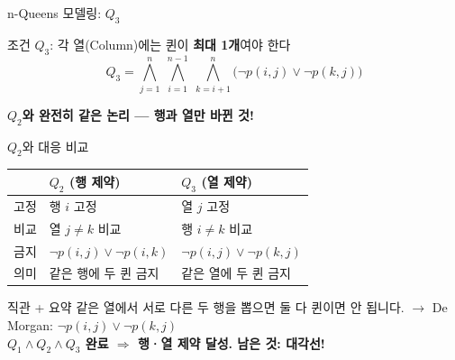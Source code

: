 \documentclass[10.5pt,compress]{beamer}
\begin{document}
\begin{frame}[t]{n-Queens 모델링: $Q_3$}
    \footnotesize

    \begin{alertblock}{조건 $Q_3$: 각 열(Column)에는 퀸이 \textbf{최대 1개}여야 한다}
        \[
            Q_3 = \bigwedge_{j=1}^{n}\; \bigwedge_{i=1}^{n-1}\; \bigwedge_{k=i+1}^{n}
            \bigl(\neg p(i,j) \lor \neg p(k,j)\bigr)
        \]
    \end{alertblock}

    \vspace{0.04cm}
    \textbf{$Q_2$와 완전히 같은 논리 — 행과 열만 바뀐 것!}

    \begin{block}{$Q_2$와 대응 비교}
        \tiny
        \renewcommand{\arraystretch}{1.1}
        \begin{tabular}{lll}
            \toprule
            & \textbf{$Q_2$ (행 제약)} & \textbf{$Q_3$ (열 제약)} \\
            \midrule
            고정 & 행 $i$ 고정 & 열 $j$ 고정 \\
            비교 & 열 $j \neq k$ 비교 & 행 $i \neq k$ 비교 \\
            금지 & $\neg p(i,j) \lor \neg p(i,k)$ & $\neg p(i,j) \lor \neg p(k,j)$ \\
            의미 & 같은 행에 두 퀸 금지 & 같은 열에 두 퀸 금지 \\
            \bottomrule
        \end{tabular}
        \renewcommand{\arraystretch}{1}
    \end{block}

    \vspace{0.02cm}
    \begin{exampleblock}{직관 + 요약}
        \scriptsize
        같은 열에서 서로 다른 두 행을 뽑으면 둘 다 퀸이면 안 됩니다.
        $\rightarrow$ De Morgan: $\neg p(i,j) \lor \neg p(k,j)$\\[2pt]
        \centering\textbf{$Q_1 \land Q_2 \land Q_3$ 완료 $\Rightarrow$ 행·열 제약 달성. 남은 것: 대각선!}
    \end{exampleblock}
\end{frame}
\end{document}
